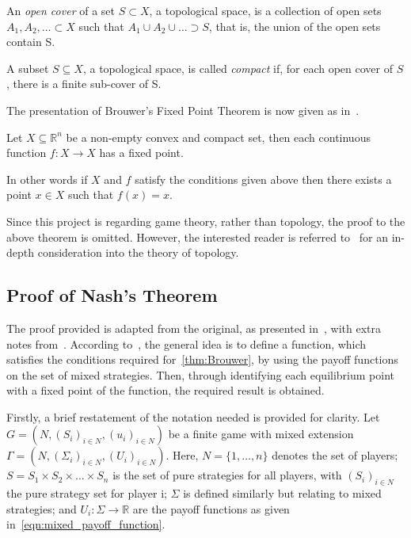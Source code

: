 \begin{definition}
    An \textit{open cover} of a set \(S \subset X\), a topological space, is a
    collection of open sets \(A_{1}, A_{2}, \ldots \subset X\) such that
    \(A_{1} \cup A_{2} \cup \ldots \supset S\), that is, the union of the open
    sets contain S.
\end{definition}\label{def:open_cover}

\begin{definition}
    A subset \(S \subseteq X\), a topological space, is called \textit{compact}
    if, for each open cover of \(S\), there is a finite sub-cover of S.
\end{definition}\label{def:compact}

The presentation of Brouwer's Fixed Point Theorem is now given as 
in~\cite{maschler_solan_zamir_2013}.

\begin{theorem}
    Let \(X \subseteq \mathbb{R}^{n}\) be a non-empty convex and compact
    set, then each continuous function \(f : X \to X\) has a fixed point.  
\end{theorem}\label{thm:Brouwer}

In other words if \(X\) and \(f\) satisfy the conditions given above then there
exists a point \(x \in X\) such that \(f(x) = x\). 

Since this project is regarding game theory, rather than topology, the proof to
the above theorem is omitted. However, the interested reader is referred
to~\cite{Henle1979} for an in-depth consideration into the theory of topology.

\subsection{Proof of Nash's Theorem}\label{subsec:Nash_Proof}
The proof provided is adapted from the original, as presented
in~\cite{nash1951non}, with extra notes from~\cite{maschler_solan_zamir_2013}.
According to~\cite{maschler_solan_zamir_2013}, the general idea is to
define a function, which satisfies the conditions required
for~\autoref{thm:Brouwer}, by using the payoff functions on the set of mixed
strategies. Then, through identifying
each equilibrium point with a fixed point of the function, the required result 
is obtained.

Firstly, a brief restatement of the notation needed is provided for clarity.
Let \(G=(N, {(S_{i})}_{i \in N}, {(u_{i})}_{i \in N})\) be a finite game with
mixed extension \(\Gamma=(N, {(\Sigma_{i})}_{i \in N}, {(U_{i})}_{i \in N})\).
Here, \(N = \{1, \ldots, n\} \) denotes the set of players; \(S = S_{1} \times S_{2} \times
\ldots \times S_{n}\) is the set of pure strategies for all players, with
\({(S_i)}_{i \in N}\) the pure strategy set for player i; \(\Sigma \) is
defined similarly but relating to mixed strategies; and \(U_{i}: \Sigma \to
\mathbb{R}\) are the payoff functions as given in~\eqref{eqn:mixed_payoff_function}.

